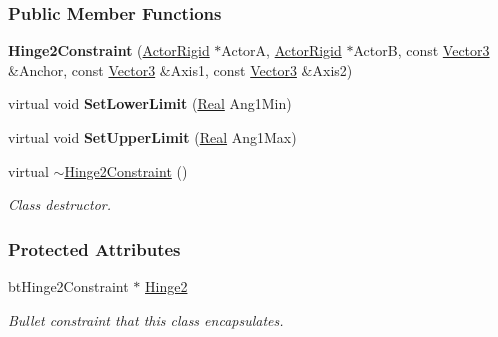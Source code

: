 \subsubsection*{Public Member Functions}
\begin{DoxyCompactItemize}
\item 
\hypertarget{classMezzanine_1_1Hinge2Constraint_acc0b4c6d39072f6e774e41c43381b6d8}{
{\bfseries Hinge2Constraint} (\hyperlink{classMezzanine_1_1ActorRigid}{ActorRigid} $\ast$ActorA, \hyperlink{classMezzanine_1_1ActorRigid}{ActorRigid} $\ast$ActorB, const \hyperlink{classMezzanine_1_1Vector3}{Vector3} \&Anchor, const \hyperlink{classMezzanine_1_1Vector3}{Vector3} \&Axis1, const \hyperlink{classMezzanine_1_1Vector3}{Vector3} \&Axis2)}
\label{classMezzanine_1_1Hinge2Constraint_acc0b4c6d39072f6e774e41c43381b6d8}

\item 
\hypertarget{classMezzanine_1_1Hinge2Constraint_acd405150e1822ae0954bf561ab52b7e7}{
virtual void {\bfseries SetLowerLimit} (\hyperlink{namespaceMezzanine_a726731b1a7df72bf3583e4a97282c6f6}{Real} Ang1Min)}
\label{classMezzanine_1_1Hinge2Constraint_acd405150e1822ae0954bf561ab52b7e7}

\item 
\hypertarget{classMezzanine_1_1Hinge2Constraint_a83ebdb0a49039249345ab0bef026cabd}{
virtual void {\bfseries SetUpperLimit} (\hyperlink{namespaceMezzanine_a726731b1a7df72bf3583e4a97282c6f6}{Real} Ang1Max)}
\label{classMezzanine_1_1Hinge2Constraint_a83ebdb0a49039249345ab0bef026cabd}

\item 
virtual \hyperlink{classMezzanine_1_1Hinge2Constraint_ac4cc8c1d461358a508785d0ccd9ea1e7}{$\sim$Hinge2Constraint} ()
\begin{DoxyCompactList}\small\item\em Class destructor. \item\end{DoxyCompactList}\end{DoxyCompactItemize}
\subsubsection*{Protected Attributes}
\begin{DoxyCompactItemize}
\item 
\hypertarget{classMezzanine_1_1Hinge2Constraint_aa28404d12e0d294b277004cdb851465a}{
btHinge2Constraint $\ast$ \hyperlink{classMezzanine_1_1Hinge2Constraint_aa28404d12e0d294b277004cdb851465a}{Hinge2}}
\label{classMezzanine_1_1Hinge2Constraint_aa28404d12e0d294b277004cdb851465a}

\begin{DoxyCompactList}\small\item\em Bullet constraint that this class encapsulates. \item\end{DoxyCompactList}\end{DoxyCompactItemize}


